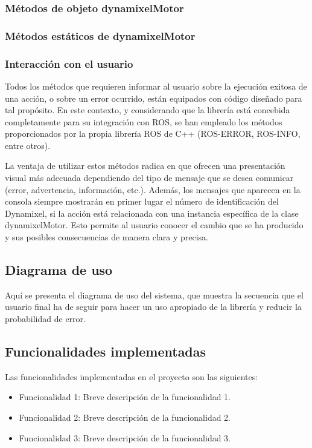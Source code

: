 \documentclass{article}
\begin{document}
\begin{itemize}
\end{itemize}

\subsubsection{Métodos de objeto dynamixelMotor}
\subsubsection{Métodos estáticos de dynamixelMotor}

\subsubsection{Interacción con el usuario}
Todos los métodos que requieren informar al usuario sobre la ejecución exitosa de una acción, o sobre un error ocurrido, están equipados con código diseñado para tal propósito. En este contexto, y considerando que la librería está concebida completamente para su integración con ROS, se han empleado los métodos proporcionados por la propia librería ROS de C++ (ROS-ERROR, ROS-INFO, entre otros).

La ventaja de utilizar estos métodos radica en que ofrecen una presentación visual más adecuada dependiendo del tipo de mensaje que se desea comunicar (error, advertencia, información, etc.). Además, los mensajes que aparecen en la consola siempre mostrarán en primer lugar el número de identificación del Dynamixel, si la acción está relacionada con una instancia específica de la clase dynamixelMotor. Esto permite al usuario conocer el cambio que se ha producido y sus posibles consecuencias de manera clara y precisa.

\subsection{Diagrama de uso}
Aquí se presenta el diagrama de uso del sistema, que muestra la secuencia que el usuario final ha de seguir para hacer un uso apropiado de la librería y reducir la probabilidad de error.

\subsection{Funcionalidades implementadas}
Las funcionalidades implementadas en el proyecto son las siguientes:
\begin{itemize}
  \item Funcionalidad 1: Breve descripción de la funcionalidad 1.
  \item Funcionalidad 2: Breve descripción de la funcionalidad 2.
  \item Funcionalidad 3: Breve descripción de la funcionalidad 3.
\end{itemize}
\end{document}
